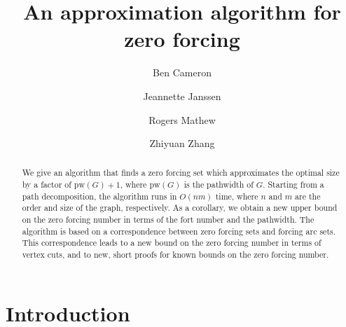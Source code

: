 \documentclass[12pt]{amsart}
\theoremstyle{plain}
\theoremstyle{definition}
\def\pw{\mathrm{pw}}
\begin{document}
\title{An approximation algorithm for zero forcing}

\author[B. Cameron]{Ben Cameron}
\address{School of Mathematical and Computational Sciences, University of Prince Edward Island, Charlottetown, PE, Canada.}

\author[J. Janssen]{Jeannette Janssen}
\address{Department of Mathematics \& Statistics, 
Dalhousie University, Halifax, Nova Scotia, Canada.}

\author[R. Mathew]{Rogers Mathew}
\address{Department of Computer Science \& Engineering, Indian Institute of Technology, Hyderabad}

\author[Z. Zhang]{Zhiyuan Zhang}
\address{Toronto Metropolitan University}


\begin{abstract}
We give an algorithm that finds a zero forcing set which approximates the optimal size by a factor of $\pw(G)+1$, where $\pw(G)$ is the pathwidth of $G$. Starting from a path decomposition, the algorithm runs in $O(nm)$ time, where $n$ and $m$ are the order and size of the graph, respectively. As a corollary, we obtain a new upper bound on the zero forcing number in terms of the fort number and the pathwidth. The algorithm is based on a correspondence between zero forcing sets and forcing arc sets. 
This correspondence leads to a new bound on the zero forcing number in terms of vertex cuts, and to new, short proofs for known bounds on the zero forcing number.
\end{abstract}

\maketitle


\section{Introduction}
\end{document}
